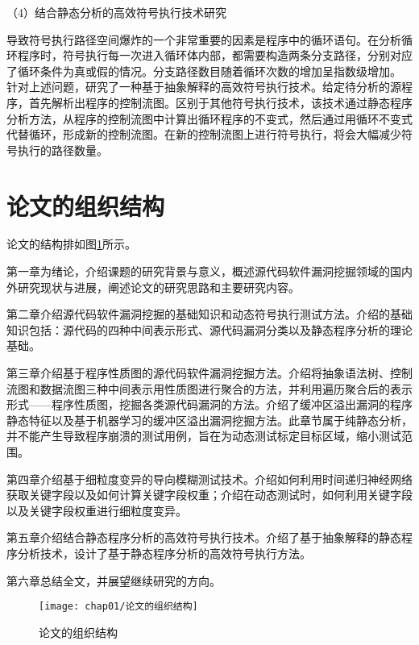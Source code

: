 （4）结合静态分析的高效符号执行技术研究

导致符号执行路径空间爆炸的一个非常重要的因素是程序中的循环语句。在分析循环程序时，符号执行每一次进入循环体内部，都需要构造两条分支路径，分别对应了循环条件为真或假的情况。分支路径数目随着循环次数的增加呈指数级增加。
针对上述问题，研究了一种基于抽象解释的高效符号执行技术。给定待分析的源程序，首先解析出程序的控制流图。区别于其他符号执行技术，该技术通过静态程序分析方法，从程序的控制流图中计算出循环程序的不变式，然后通过用循环不变式代替循环，形成新的控制流图。在新的控制流图上进行符号执行，将会大幅减少符号执行的路径数量。




\section{论文的组织结构}

论文的结构排如图\ref{论文的组织结构}所示。

第一章为绪论，介绍课题的研究背景与意义，概述源代码软件漏洞挖掘领域的国内外研究现状与进展，阐述论文的研究思路和主要研究内容。

第二章介绍源代码软件漏洞挖掘的基础知识和动态符号执行测试方法。介绍的基础知识包括：源代码的四种中间表示形式、源代码漏洞分类以及静态程序分析的理论基础。

第三章介绍基于程序性质图的源代码软件漏洞挖掘方法。介绍将抽象语法树、控制流图和数据流图三种中间表示用性质图进行聚合的方法，并利用遍历聚合后的表示形式——程序性质图，挖掘各类源代码漏洞的方法。介绍了缓冲区溢出漏洞的程序静态特征以及基于机器学习的缓冲区溢出漏洞挖掘方法。此章节属于纯静态分析，并不能产生导致程序崩溃的测试用例，旨在为动态测试标定目标区域，缩小测试范围。

第四章介绍基于细粒度变异的导向模糊测试技术。介绍如何利用时间递归神经网络获取关键字段以及如何计算关键字段权重；介绍在动态测试时，如何利用关键字段以及关键字段权重进行细粒度变异。

第五章介绍结合静态程序分析的高效符号执行技术。介绍了基于抽象解释的静态程序分析技术，设计了基于静态程序分析的高效符号执行方法。


第六章总结全文，并展望继续研究的方向。


\begin{figure}[htb]
\begin{center}
\texttt{[image: chap01/论文的组织结构]}
\end{center}
\caption{论文的组织结构}
\label{论文的组织结构}
\end{figure}

